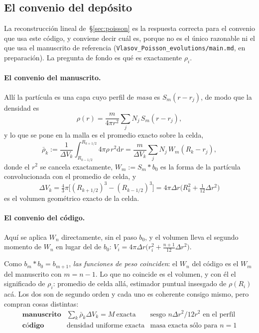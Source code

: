 \documentclass[11pt,a4paper]{article}
\newcommand{\dd}{\mathrm{d}}
\begin{document}
\subsection{El convenio del depósito}
\label{sec:convenio}

La reconstrucción lineal de~\S\ref{sec:poisson} es la respuesta correcta para el convenio
que usa este código, y conviene decir cuál es, porque no es el único razonable ni el que
usa el manuscrito de referencia (\texttt{Vlasov\_Poisson\_evolutions/main.md}, en
preparación). La pregunta de fondo es qué es exactamente $\rho_i$.

\paragraph{El convenio del manuscrito.} Allí la partícula es una capa cuyo perfil de
\emph{masa} es $S_m(r-r_j)$, de modo que la densidad es
\begin{equation}
  \rho(r)=\frac{m}{4\pi r^{2}}\sum_j N_j\,S_m(r-r_j),
\end{equation}
y lo que se pone en la malla es el promedio exacto sobre la celda,
\begin{equation}
  \bar\rho_k:=\frac{1}{\Delta V_k}\int_{R_{k-1/2}}^{R_{k+1/2}}4\pi\rho\,r^{2}\dd r
  =\frac{m}{\Delta V_k}\sum_j N_j\,W_m(R_k-r_j),
  \label{eq:rho_manuscrito}
\end{equation}
donde el $r^{2}$ se cancela exactamente, $W_m:=S_m*b_0$ es la forma de la partícula
convolucionada con el promedio de celda, y
\begin{equation}
  \Delta V_k=\tfrac43\pi\big[(R_{k+1/2})^{3}-(R_{k-1/2})^{3}\big]
  =4\pi\Delta r\Big(R_k^{2}+\tfrac{1}{12}\Delta r^{2}\Big)
\end{equation}
es el volumen geométrico exacto de la celda.

\paragraph{El convenio del código.} Aquí se aplica $W_n$ directamente, sin el paso $b_0$,
y el volumen lleva el segundo momento de $W_n$ en lugar del de $b_0$:
$V_i=4\pi\Delta r\big(r_i^{2}+\tfrac{n+1}{12}\Delta r^{2}\big)$.

Como $b_m*b_0=b_{m+1}$, \emph{las funciones de peso coinciden}: el $W_n$ del código es el
$W_m$ del manuscrito con $m=n-1$. Lo que no coincide es el volumen, y con él el
significado de $\rho_i$: promedio de celda allá, estimador puntual insesgado de
$\rho(R_i)$ acá. Los dos son de segundo orden y cada uno es coherente consigo mismo, pero
compran cosas distintas:
\begin{equation*}
\begin{array}{lll}
\textbf{manuscrito} & \sum_k\bar\rho_k\Delta V_k=M\ \text{exacta} &
  \text{sesgo }n\Delta r^{2}/12r^{2}\text{ en el perfil}\\[2pt]
\textbf{código} & \text{densidad uniforme exacta} &
  \text{masa exacta sólo para }n=1
\end{array}
\end{equation*}
\end{document}

